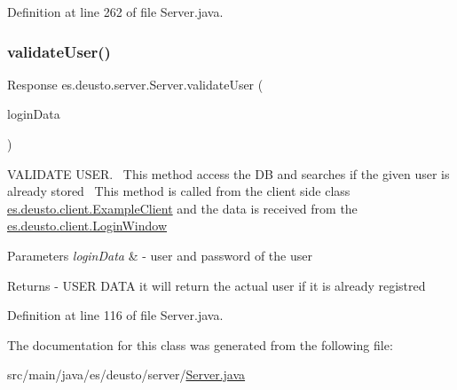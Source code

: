 Definition at line 262 of file Server.\+java.

\mbox{\label{classes_1_1deusto_1_1server_1_1_server_a6e5f5013058ddaf970b0b21da2e32f66}} 
\subsubsection{\texorpdfstring{validate\+User()}{validateUser()}}
{\footnotesize\ttfamily Response es.\+deusto.\+server.\+Server.\+validate\+User (\begin{DoxyParamCaption}\item[{\hyperlink{classes_1_1deusto_1_1serialization_1_1_login_data}{Login\+Data}}]{login\+Data }\end{DoxyParamCaption})}

V\+A\+L\+I\+D\+A\+TE U\+S\+ER.~\newline
This method access the DB and searches if the given user is already stored~\newline
This method is called from the client side class \hyperlink{classes_1_1deusto_1_1client_1_1_example_client}{es.\+deusto.\+client.\+Example\+Client} and the data is received from the \hyperlink{classes_1_1deusto_1_1client_1_1_login_window}{es.\+deusto.\+client.\+Login\+Window}~\newline
 
\begin{DoxyParams}{Parameters}
{\em login\+Data} & -\/ user and password of the user \\
\hline
\end{DoxyParams}
\begin{DoxyReturn}{Returns}
-\/ U\+S\+ER D\+A\+TA it will return the actual user if it is already registred 
\end{DoxyReturn}


Definition at line 116 of file Server.\+java.



The documentation for this class was generated from the following file\+:\begin{DoxyCompactItemize}
\item 
src/main/java/es/deusto/server/\hyperlink{_server_8java}{Server.\+java}\end{DoxyCompactItemize}
